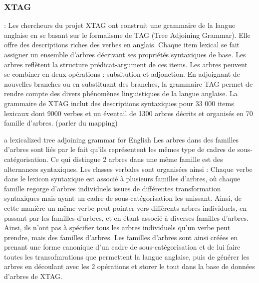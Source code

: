 \subsubsection{XTAG} : Les chercheurs du projet XTAG ont construit une grammaire de la langue anglaise en se basant sur le formalisme de TAG (Tree Adjoining Grammar). Elle offre des descriptions riches des verbes en anglais. Chaque item lexical se fait assigner un ensemble d'arbres décrivant ses propriétés syntaxiques de base. Les arbres reflètent la structure prédicat-argument de ces items. Les arbres peuvent se combiner en deux opérations : subsitution et adjonction. En adjoignant de nouvelles branches ou en substituant des branches, la grammaire TAG permet de rendre compte des divers phénomènes linguistiques de la langue anglaise. La grammaire de XTAG inclut des descriptions syntaxiques pour 33 000 items lexicaux dont 9000 verbes et un éventail de 1300 arbres décrits et organisés en 70 famille d'arbres.
(parler du mapping)

a lexicalized tree adjoining grammar for English \citep{ResearchGroupLexicalizedTreeAdjoining2001}
Les arbres dans des familles d'arbres sont liés par le fait qu'ils représentent les mêmes type de cadres de sous-catégorisation. Ce qui distingue 2 arbres dans une même famille est des alternances syntaxiques. Les classes verbales sont organisées ainsi : Chaque verbe dans le lexicon syntaxique est associé à plusieurs familles d'arbres, où chaque famille regorge d'arbres individuels issues de différentes transformation syntaxiques mais ayant un cadre de sous-catégorisation les unissant. Ainsi, de cette manière un même verbe peut pointer vers différents arbres individuels, en passant par les familles d'arbres, et en étant associé à diverses familles d'arbres. Ainsi, ils n'ont pas à spécifier tous les arbres individuels qu'un verbe peut prendre, mais des familles d'arbres. Les familles d'arbres sont ainsi créées en prenant une forme canonique d'un cadre de sous-catégorisation et de lui faire toutes les transofmrations que permettent la langue anglaise, puis de générer les arbres en découlant avec les 2 opérations et storer le tout dans la base de données d'arbres de XTAG.

